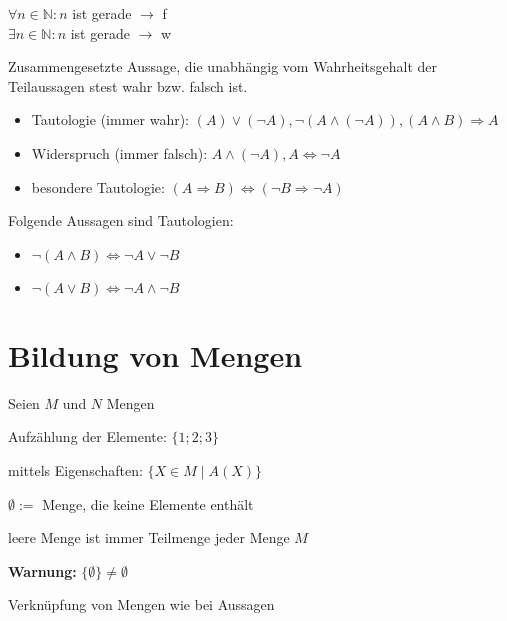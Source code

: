 \begin{exmpn}
	$\forall n \in \mathbb{N}: n$ ist gerade $\to$ f\\
	$\exists n \in \mathbb{N}: n$ ist gerade $\to$ w 
\end{exmpn}

\begin{mydef}
	Zusammengesetzte Aussage, die unabhängig vom Wahrheitsgehalt der Teilaussagen stest wahr bzw. falsch ist.
\end{mydef}

\newpage
\begin{exmpn}
	\begin{itemize}
		\item Tautologie (immer wahr): 
		$(A) \lor (\lnot A), \lnot (A  \land (\lnot A)), (A \land B) \Rightarrow A$
		\item Widerspruch (immer falsch): $A \land (\lnot A), A \iff \lnot A$  
		\item besondere Tautologie: $(A \Rightarrow B) \iff (\lnot B \Rightarrow \lnot A)$
	\end{itemize}
\end{exmpn}

\begin{satz}
	Folgende Aussagen sind Tautologien:
	\begin{itemize}{ }
		\item $\lnot(A \land B) \iff \lnot A \lor \lnot B$
		\item $\lnot(A \lor B) \iff \lnot A \land \lnot B$
	\end{itemize}
\end{satz}

\section*{Bildung von Mengen}
Seien $M$ und $N$ Mengen
\begin{compactitem}
	\item Aufzählung der Elemente: $\{1;2;3\}$
	\item mittels Eigenschaften: $\{X \in M \mid A(X)\}$
	\item $\emptyset:=$ Menge, die keine Elemente enthält
	\begin{compactitem}
		\item leere Menge ist immer Teilmenge jeder Menge $M$
		\item \textbf{Warnung:} $\{\emptyset\} \neq \emptyset$
	\end{compactitem}
	\item Verknüpfung von Mengen wie bei Aussagen
\end{compactitem}

